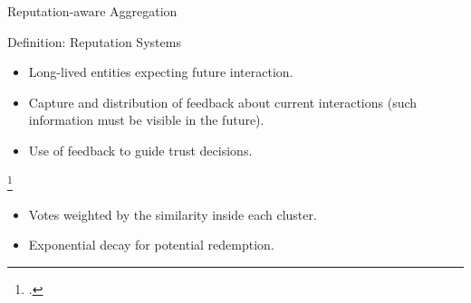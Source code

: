 



\begin{frame}{Reputation-aware Aggregation}

  \begin{block}{Definition: Reputation Systems\normalfont~\autocite{resnick_Reputationsystems_2000}}
    \begin{itemize}
      \item Long-lived entities expecting future interaction.
      \item Capture and distribution of feedback about current interactions (such information must be visible in the future).
      \item Use of feedback to guide trust decisions.
    \end{itemize}
  \end{block}
  \footcite*{resnick_Reputationsystems_2000}

  \pause
  \begin{itemize}
    \item Votes weighted by the similarity inside each cluster.
    \item Exponential decay for potential redemption.
  \end{itemize}

\end{frame}

